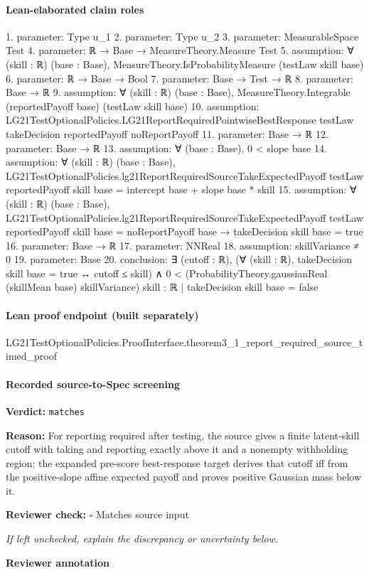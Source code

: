 \documentclass[10pt]{article}
\newcommand{\reviewerbox}{%
  \par\noindent\fbox{\parbox{0.96\linewidth}{\rule{0pt}{0.38in}}}\par
}
\newcommand{\reviewmatch}[1]{%
  \par\noindent\textbf{Reviewer check:} $\square$\; #1\par
  \noindent\emph{If left unchecked, explain the discrepancy or uncertainty below.}\par
}
\begin{document}
\paragraph{Lean-elaborated claim roles}\begin{ReviewVerbatim}
1. parameter: Type u_1
2. parameter: Type u_2
3. parameter: MeasurableSpace Test
4. parameter: ℝ → Base → MeasureTheory.Measure Test
5. assumption: ∀ (skill : ℝ) (base : Base), MeasureTheory.IsProbabilityMeasure (testLaw skill base)
6. parameter: ℝ → Base → Bool
7. parameter: Base → Test → ℝ
8. parameter: Base → ℝ
9. assumption: ∀ (skill : ℝ) (base : Base), MeasureTheory.Integrable (reportedPayoff base) (testLaw skill base)
10. assumption: LG21TestOptionalPolicies.LG21ReportRequiredPointwiseBestResponse testLaw takeDecision reportedPayoff noReportPayoff
11. parameter: Base → ℝ
12. parameter: Base → ℝ
13. assumption: ∀ (base : Base), 0 < slope base
14. assumption: ∀ (skill : ℝ) (base : Base),
  LG21TestOptionalPolicies.lg21ReportRequiredSourceTakeExpectedPayoff testLaw reportedPayoff skill base =
    intercept base + slope base * skill
15. assumption: ∀ (skill : ℝ) (base : Base),
  LG21TestOptionalPolicies.lg21ReportRequiredSourceTakeExpectedPayoff testLaw reportedPayoff skill base =
      noReportPayoff base →
    takeDecision skill base = true
16. parameter: Base → ℝ
17. parameter: NNReal
18. assumption: skillVariance ≠ 0
19. parameter: Base
20. conclusion: ∃ (cutoff : ℝ),
  (∀ (skill : ℝ), takeDecision skill base = true ↔ cutoff ≤ skill) ∧
    0 < (ProbabilityTheory.gaussianReal (skillMean base) skillVariance) {skill : ℝ | takeDecision skill base = false}
\end{ReviewVerbatim}

\paragraph{Lean proof endpoint (built separately)}\begin{ReviewVerbatim}
LG21TestOptionalPolicies.ProofInterface.theorem3_1_report_required_source_timed_proof
\end{ReviewVerbatim}

\paragraph{Recorded source-to-Spec screening}
\textbf{Verdict:} \texttt{matches}
\\
{\raggedright
\textbf{Reason:} For reporting required after testing, the source gives a finite latent-\allowbreak{}skill cutoff with taking and reporting exactly above it and a nonempty withholding region;\allowbreak{} the expanded pre-\allowbreak{}score best-\allowbreak{}response target derives that cutoff iff from the positive-\allowbreak{}slope affine expected payoff and proves positive Gaussian mass below it.\allowbreak{}
\par}
\reviewmatch{Matches source input}
\noindent\textbf{Reviewer annotation}\par
\reviewerbox
\clearpage
\hypertarget{source-claim-1fc46568cc4fe01e}{}
\end{document}
